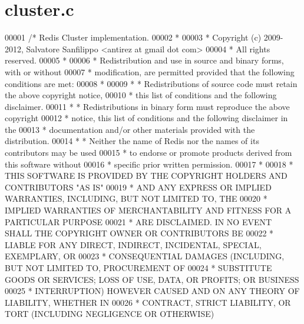 \hypertarget{cluster_8c_source}{}\section{cluster.\+c}
\label{cluster_8c_source}

\begin{DoxyCode}
00001 \textcolor{comment}{/* Redis Cluster implementation.}
00002 \textcolor{comment}{ *}
00003 \textcolor{comment}{ * Copyright (c) 2009-2012, Salvatore Sanfilippo <antirez at gmail dot com>}
00004 \textcolor{comment}{ * All rights reserved.}
00005 \textcolor{comment}{ *}
00006 \textcolor{comment}{ * Redistribution and use in source and binary forms, with or without}
00007 \textcolor{comment}{ * modification, are permitted provided that the following conditions are met:}
00008 \textcolor{comment}{ *}
00009 \textcolor{comment}{ *   * Redistributions of source code must retain the above copyright notice,}
00010 \textcolor{comment}{ *     this list of conditions and the following disclaimer.}
00011 \textcolor{comment}{ *   * Redistributions in binary form must reproduce the above copyright}
00012 \textcolor{comment}{ *     notice, this list of conditions and the following disclaimer in the}
00013 \textcolor{comment}{ *     documentation and/or other materials provided with the distribution.}
00014 \textcolor{comment}{ *   * Neither the name of Redis nor the names of its contributors may be used}
00015 \textcolor{comment}{ *     to endorse or promote products derived from this software without}
00016 \textcolor{comment}{ *     specific prior written permission.}
00017 \textcolor{comment}{ *}
00018 \textcolor{comment}{ * THIS SOFTWARE IS PROVIDED BY THE COPYRIGHT HOLDERS AND CONTRIBUTORS "AS IS"}
00019 \textcolor{comment}{ * AND ANY EXPRESS OR IMPLIED WARRANTIES, INCLUDING, BUT NOT LIMITED TO, THE}
00020 \textcolor{comment}{ * IMPLIED WARRANTIES OF MERCHANTABILITY AND FITNESS FOR A PARTICULAR PURPOSE}
00021 \textcolor{comment}{ * ARE DISCLAIMED. IN NO EVENT SHALL THE COPYRIGHT OWNER OR CONTRIBUTORS BE}
00022 \textcolor{comment}{ * LIABLE FOR ANY DIRECT, INDIRECT, INCIDENTAL, SPECIAL, EXEMPLARY, OR}
00023 \textcolor{comment}{ * CONSEQUENTIAL DAMAGES (INCLUDING, BUT NOT LIMITED TO, PROCUREMENT OF}
00024 \textcolor{comment}{ * SUBSTITUTE GOODS OR SERVICES; LOSS OF USE, DATA, OR PROFITS; OR BUSINESS}
00025 \textcolor{comment}{ * INTERRUPTION) HOWEVER CAUSED AND ON ANY THEORY OF LIABILITY, WHETHER IN}
00026 \textcolor{comment}{ * CONTRACT, STRICT LIABILITY, OR TORT (INCLUDING NEGLIGENCE OR OTHERWISE)}

\end{DoxyCode}
